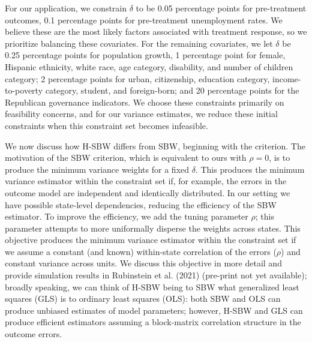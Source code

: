 \documentclass{article}
\begin{document}
For our application, we constrain $\delta$ to be 0.05 percentage points for pre-treatment outcomes, 0.1 percentage points for pre-treatment unemployment rates. We believe these are the most likely factors associated with treatment response, so we prioritize balancing these covariates. For the remaining covariates, we let $\delta$ be 0.25 percentage points for population growth, 1 percentage point for female, Hispanic ethnicity, white race, age category, disability, and number of children category; 2 percentage points for urban, citizenship, education category, income-to-poverty category, student, and foreign-born; and 20 percentage points for the Republican governance indicators. We choose these constraints primarily on feasibility concerns, and for our variance estimates, we reduce these initial constraints when this constraint set becomes infeasible.

We now discuss how H-SBW differs from SBW, beginning with the criterion. The motivation of the SBW criterion, which is equivalent to ours with $\rho = 0$, is to produce the minimum variance weights for a fixed $\delta$. This produces the minimum variance estimator within the constraint set if, for example, the errors in the outcome model are independent and identically distributed. In our setting we have possible state-level dependencies, reducing the efficiency of the SBW estimator. To improve the efficiency, we add the tuning parameter $\rho$; this parameter attempts to more uniformally disperse the weights across states. This objective produces the minimum variance estimator within the constraint set if we assume a constant (and known) within-state correlation of the errors ($\rho$) and constant variance across units. We discuss this objective in more detail and provide simulation results in Rubinstein et al. (2021) (pre-print not yet available); broadly speaking, we can think of H-SBW being to SBW what generalized least squares (GLS) is to ordinary least squares (OLS): both SBW and OLS can produce unbiased estimates of model parameters; however, H-SBW and GLS can produce efficient estimators assuming a block-matrix correlation structure in the outcome errors. 
\end{document}
